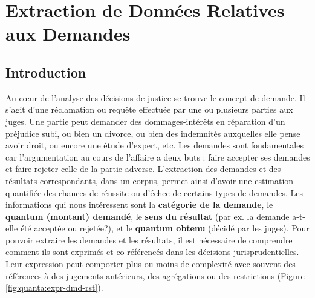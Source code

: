 \chapter{Extraction de Données Relatives aux Demandes}
\label{chap:quanta}

\section{Introduction}
\label{sec:quanta:introduction}
Au c\oe{}ur de l'analyse des décisions de justice se trouve le concept de demande. Il s'agit d'une réclamation ou requête effectuée par une ou plusieurs parties aux juges. Une partie peut demander des dommages-intérêts en réparation d'un préjudice subi, ou bien un divorce, ou bien des indemnités auxquelles elle pense avoir droit, ou encore une étude d'expert, etc. Les demandes sont fondamentales car l'argumentation au cours de l'affaire a deux buts : faire accepter ses demandes et faire rejeter celle de la partie adverse. L'extraction des demandes et des résultats correspondants, dans un corpus, permet ainsi d'avoir une estimation quantifiée des chances de réussite ou d'échec de certains types de demandes. Les informations qui nous intéressent sont la \textbf{catégorie de la demande}, le \textbf{quantum (montant) demandé}, le \textbf{sens du résultat} (par ex. la demande a-t-elle été acceptée ou rejetée?), et le \textbf{quantum obtenu} (décidé par les juges). Pour pouvoir extraire les demandes et les résultats, il est nécessaire de comprendre comment ils sont exprimés et co-référencés dans les décisions jurisprudentielles. Leur expression peut comporter plus ou moins de complexité avec souvent des références à des jugements antérieurs, des agrégations ou des restrictions (Figure \ref{fig:quanta:expr-dmd-rst}).

